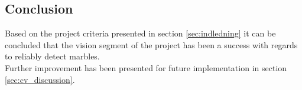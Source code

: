 \documentclass[../../../main.tex]{subfiles}
\begin{document}
\subsection{Conclusion}%
\label{sec:cv_conclusion}

Based on the project criteria presented in section \ref{sec:indledning} it can be concluded that the vision segment of the project has been a
success with regards to reliably detect marbles.\\
Further improvement has been presented for future implementation in section \ref{sec:cv_discussion}.
\end{document}
